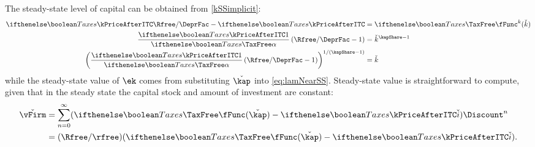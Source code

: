 The steady-state level of capital can be obtained from \eqref{kSSimplicit}:
\begin{equation}\begin{gathered}\begin{aligned}
 \ifTax{\kPriceAfterITC}{}\Rfree/\DeprFac -\ifTax{\kPriceAfterITC}{} & =   \ifTax{\TaxFree}{}\fFunc^{k}(\check{k})
\\ \frac{\ifTax{\kPriceAfterITC}{1}}{\ifTax{\TaxFree}{}\alpha} \left(\Rfree/\DeprFac -1\right) & =   \check{k}^{\kapShare-1}
\\ \left(\frac{\ifTax{\kPriceAfterITC}{1}}{\ifTax{\TaxFree}{}\alpha} \left(\Rfree/\DeprFac -1\right)\right)^{1/(\kapShare-1)} & =   \check{k} \label{eq:kSS}
\end{aligned}\end{gathered}\end{equation}
while the steady-state value of $\ek$ comes from substituting $\check{\kap}$ into \eqref{eq:lamNearSS}.  Steady-state value 
is straightforward to compute, given that in the steady state the capital stock and amount of investment are constant:
\begin{equation}\begin{gathered}\begin{aligned}
  \check{\vFirm} & =  \sum_{n=0}^{\infty} (\ifTax{\TaxFree}{} \fFunc(\check{\kap})-\ifTax{\kPriceAfterITC}{}\check{i})\Discount^{n}
\\ & =  (\Rfree/\rfree)(\ifTax{\TaxFree}{} \fFunc(\check{\kap}) - \ifTax{\kPriceAfterITC}{}\check{i}).
\end{aligned}\end{gathered}\end{equation}


